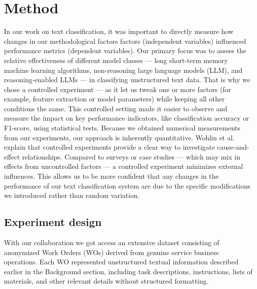 \section{Method}
%
%
%
In our work on text classification, it was important to directly measure how changes in our methodological factors factors (independent variables) influenced performance metrics (dependent variables). Our primary focus was to assess the relative effectiveness of different model classes --- long short-term memory machine learning algorithms, non-reasoning large language models (LLM), and reasoning-enabled LLMs --- in classifying unstructured text data. That is why we chose a controlled experiment --- as it let us tweak one or more factors (for example, feature extraction or model parameters) while keeping all other conditions the same. This controlled setting made it easier to observe and measure the impact on key performance indicators, like classification accuracy or F1-score, using statistical tests. Because we obtained numerical measurements from our experiments, our approach is inherently quantitative.
Wohlin et al. \cite{wohlin2000software} explain that controlled experiments provide a clear way to investigate cause-and-effect relationships. Compared to surveys or case studies --- which may mix in effects from uncontrolled factors --- a controlled experiment minimizes external influences. This allows us to be more confident that any changes in the performance of our text classification system are due to the specific modifications we introduced rather than random variation.

\subsection{Experiment design}
With our collaboration we got access an extensive dataset consisting of anonymized Work Orders (WOs) derived from genuine service business operations. Each WO represented unstructured textual information described earlier in the Background section, including task descriptions, instructions, lists of materials, and other relevant details without structured formatting.

